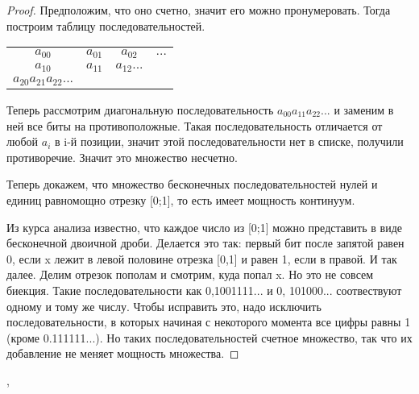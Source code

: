 \documentclass[a4paper,12pt]{article}
\begin{document}
    \begin{proof}
        Предположим, что оно счетно, значит его можно пронумеровать. Тогда построим таблицу
        последовательностей.
        \begin{center}
            \begin{tabular}{cccc}
                $a_{00}$ & $a_{01}$ & $a_{02}$ & $\ldots$ \\
                $a_{10}$ & $a_{11}$ & $a_{12} ...$ \\
                $a_{20} a_{21} a_{22} ...$ \\
            \end{tabular}
        \end{center}
        
        
        Теперь рассмотрим диагональную последовательность  $a_{00} a_{11} a_{22} ...$ и
        заменим в ней все биты на противоположные. Такая последовательность отличается
        от любой $a_{i}$ в i-й позиции, значит этой последовательности нет в списке,
        получили противоречие. Значит это множество несчетно.
        
        Теперь докажем, что множество бесконечных последовательностей нулей и единиц равномощно
        отрезку [0;1], то есть имеет мощность континуум.
        
        Из курса анализа известно, что каждое число из [0;1] можно представить в виде
        бесконечной двоичной дроби. Делается это так: первый бит после запятой равен 0, если
        x лежит в левой половине отрезка [0,1] и равен 1, если в правой. И так далее. Делим
        отрезок пополам и смотрим, куда попал x. Но это не совсем биекция. Такие последовательности
        как 0,1001111... и 0, 101000... соотвествуют одному и тому же числу. Чтобы исправить
        это, надо исключить последовательности, в которых начиная с некоторого момента все
        цифры равны 1 (кроме 0.111111...). Но таких последовательностей счетное множество, так
        что их добавление не меняет мощность множества.
    \end{proof}
    
    
    
    \sep
\end{document}
